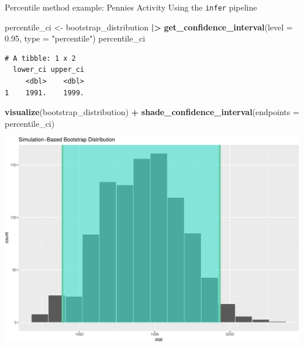 \documentclass[
  ignorenonframetext,
]{beamer}
\newenvironment{Shaded}{\begin{snugshade}}{\end{snugshade}}
\newcommand{\AttributeTok}[1]{\textcolor[rgb]{0.13,0.29,0.53}{#1}}
\newcommand{\FloatTok}[1]{\textcolor[rgb]{0.00,0.00,0.81}{#1}}
\newcommand{\FunctionTok}[1]{\textcolor[rgb]{0.13,0.29,0.53}{\textbf{#1}}}
\newcommand{\NormalTok}[1]{#1}
\newcommand{\OtherTok}[1]{\textcolor[rgb]{0.56,0.35,0.01}{#1}}
\newcommand{\SpecialCharTok}[1]{\textcolor[rgb]{0.81,0.36,0.00}{\textbf{#1}}}
\newcommand{\StringTok}[1]{\textcolor[rgb]{0.31,0.60,0.02}{#1}}
\begin{document}
\begin{frame}[fragile]{Percentile method example: Pennies Activity}
\protect\hypertarget{percentile-method-example-pennies-activity-3}{}
Using the \texttt{infer} pipeline

\tiny

\begin{Shaded}
\begin{Highlighting}[]
\NormalTok{percentile\_ci }\OtherTok{\textless{}{-}}\NormalTok{ bootstrap\_distribution }\SpecialCharTok{|\textgreater{}} 
  \FunctionTok{get\_confidence\_interval}\NormalTok{(}\AttributeTok{level =} \FloatTok{0.95}\NormalTok{, }\AttributeTok{type =} \StringTok{"percentile"}\NormalTok{)}
\NormalTok{percentile\_ci}
\end{Highlighting}
\end{Shaded}

\begin{verbatim}
# A tibble: 1 x 2
  lower_ci upper_ci
     <dbl>    <dbl>
1    1991.    1999.
\end{verbatim}

\begin{Shaded}
\begin{Highlighting}[]
\FunctionTok{visualize}\NormalTok{(bootstrap\_distribution) }\SpecialCharTok{+} 
  \FunctionTok{shade\_confidence\_interval}\NormalTok{(}\AttributeTok{endpoints =}\NormalTok{ percentile\_ci)}
\end{Highlighting}
\end{Shaded}

\begin{center}\includegraphics[width=0.7\linewidth,height=0.4\textheight]{Week10_Lect_files/figure-beamer/unnamed-chunk-17-1} \end{center}
\normalsize
\end{frame}
\end{document}
